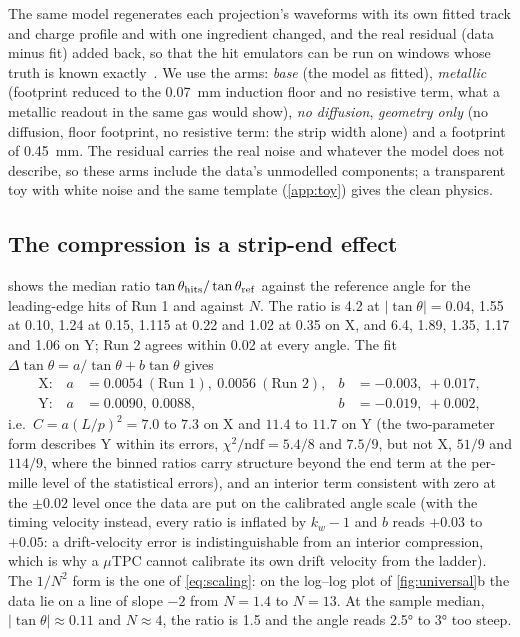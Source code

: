 The same model regenerates each projection's waveforms with its own fitted track and charge profile and with one ingredient
changed, and the real residual (data minus fit) added back, so that the hit emulators can be run on windows whose truth is
known exactly~\cite{paperII}. We use the arms: \emph{base} (the model as fitted), \emph{metallic} (footprint reduced to the
\SI{0.07}{mm} induction floor and no resistive term, what a metallic readout in the same gas would show), \emph{no diffusion}, \emph{geometry only}
(no diffusion, floor footprint, no resistive term: the strip width alone) and a footprint of \SI{0.45}{mm}. The residual carries
the real noise and whatever the model does not describe, so these arms include the data's unmodelled components; a
transparent toy with white noise and the same template (\cref{app:toy}) gives the clean physics.

\subsection{The compression is a strip-end effect}\label{sec:ratio}

 shows the median ratio $\tan\theta_{\rm hits}/\tan\theta_{\rm ref}$ against the reference angle for the
leading-edge hits of Run 1 and against $N$. The ratio is 4.2 at $|\tan\theta| = 0.04$, 1.55 at 0.10, 1.24 at 0.15, 1.115 at
0.22 and 1.02 at 0.35 on X, and 6.4, 1.89, 1.35, 1.17 and 1.06 on Y; Run 2 agrees within 0.02 at every angle. The fit
$\Delta\tan\theta = a/\tan\theta + b\tan\theta$ gives
\begin{align*}
  \text{X:}\quad a &= 0.0054\ (\text{Run 1}),\ 0.0056\ (\text{Run 2}), & b &= -0.003,\ +0.017, \\
  \text{Y:}\quad a &= 0.0090,\ 0.0088, & b &= -0.019,\ +0.002,
\end{align*}
i.e.\ $C = a(L/p)^2 = 7.0$ to $7.3$ on X and $11.4$ to $11.7$ on Y (the two-parameter form describes Y within its errors,
$\chi^2/\mathrm{ndf} = 5.4/8$ and $7.5/9$, but not X, $51/9$ and $114/9$, where the binned ratios carry structure beyond the
end term at the per-mille level of the statistical errors), and an interior term consistent with zero at the
$\pm 0.02$ level once the data are put on the calibrated angle scale (with the timing velocity instead, every ratio is inflated by
$k_w - 1$ and $b$ reads $+0.03$ to $+0.05$: a drift-velocity error is indistinguishable from an interior compression, which is why
a $\mu$TPC cannot calibrate its own drift velocity from the ladder). The $1/N^2$ form is the one of \cref{eq:scaling}: on the
log--log plot of \cref{fig:universal}b the data lie on a line of slope $-2$ from $N = 1.4$ to $N = 13$. At the sample median,
$|\tan\theta| \approx 0.11$ and $N \approx 4$, the ratio is 1.5 and the angle reads \ang{2.5} to \ang{3} too steep.

